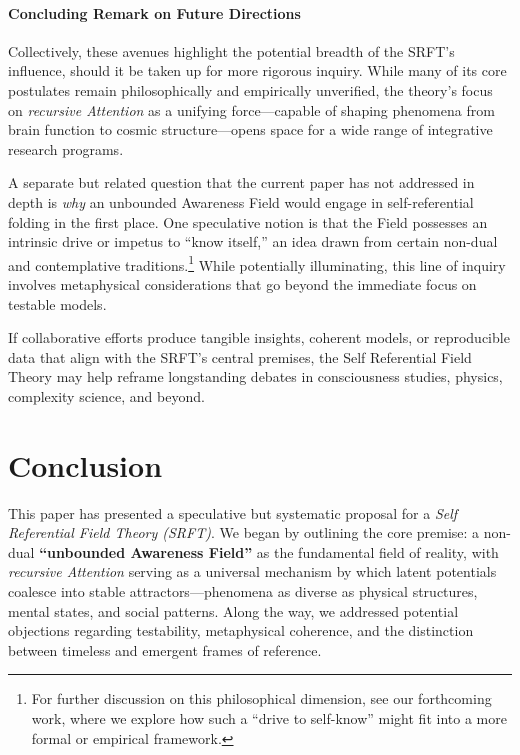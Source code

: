 \documentclass[12pt,a4paper]{article}
\begin{document}
\paragraph{Concluding Remark on Future Directions}
Collectively, these avenues highlight the potential breadth of the SRFT’s influence, should it be taken up for more rigorous inquiry. While many of its core postulates remain philosophically and empirically unverified, the theory’s focus on \emph{recursive Attention} as a unifying force---capable of shaping phenomena from brain function to cosmic structure---opens space for a wide range of integrative research programs. 

A separate but related question that the current paper has not addressed in depth is \emph{why} an unbounded Awareness Field would engage in self-referential folding in the first place. One speculative notion is that the Field possesses an intrinsic drive or impetus to “know itself,” an idea drawn from certain non-dual and contemplative traditions.\footnote{For further discussion on this philosophical dimension, see our forthcoming work, where we explore how such a “drive to self-know” might fit into a more formal or empirical framework.} While potentially illuminating, this line of inquiry involves metaphysical considerations that go beyond the immediate focus on testable models. 

If collaborative efforts produce tangible insights, coherent models, or reproducible data that align with the SRFT’s central premises, the Self Referential Field Theory may help reframe longstanding debates in consciousness studies, physics, complexity science, and beyond.


\section{Conclusion}
\label{sec:conclusion}

This paper has presented a speculative but systematic proposal for a \emph{Self Referential Field Theory (SRFT)}. We began by outlining the core premise: a non-dual \textbf{“unbounded Awareness Field”} as the fundamental field of reality, with \emph{recursive Attention} serving as a universal mechanism by which latent potentials coalesce into stable attractors—phenomena as diverse as physical structures, mental states, and social patterns. Along the way, we addressed potential objections regarding testability, metaphysical coherence, and the distinction between timeless and emergent frames of reference.
\end{document}
